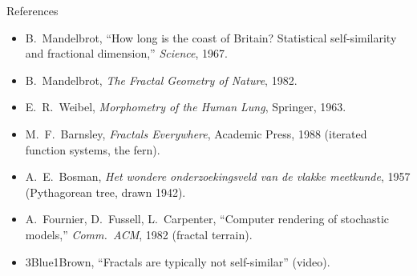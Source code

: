 \begin{frame}{References}
  \footnotesize
  \begin{itemize}
    \item B.~Mandelbrot, ``How long is the coast of Britain? Statistical self-similarity and fractional dimension,'' \textit{Science}, 1967.
    \item B.~Mandelbrot, \textit{The Fractal Geometry of Nature}, 1982.
    \item E.~R.~Weibel, \textit{Morphometry of the Human Lung}, Springer, 1963.
    \item M.~F.~Barnsley, \textit{Fractals Everywhere}, Academic Press, 1988 (iterated function systems, the fern).
    \item A.~E.~Bosman, \textit{Het wondere onderzoekingsveld van de vlakke meetkunde}, 1957 (Pythagorean tree, drawn 1942).
    \item A.~Fournier, D.~Fussell, L.~Carpenter, ``Computer rendering of stochastic models,'' \textit{Comm.~ACM}, 1982 (fractal terrain).
    \item 3Blue1Brown, ``Fractals are typically not self-similar'' (video).
  \end{itemize}
\end{frame}


